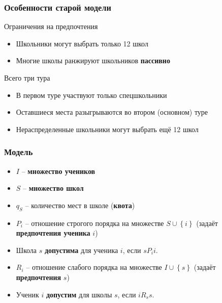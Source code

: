 \documentclass[10pt,pdf,hyperref={unicode}]{beamer}
\begin{document}
\begin{frame}
    \frametitle{Особенности старой модели}
    \begin{block}{Ограничения на предпочтения}
        \begin{itemize}
            \item Школьники могут выбрать только 12 школ
            \item Многие школы ранжируют школьников {\bf пассивно}
        \end{itemize}
    \end{block}

    \begin{block}{Всего три тура}
        \begin{itemize}
        \item В первом туре участвуют только спецшкольники
        \item Оставшиеся места разыгрываются во втором (основном) туре
        \item Нераспределенные школьники могут выбрать ещё 12 школ
        \end{itemize}
    \end{block}
\end{frame}

\begin{frame}
    \frametitle{Модель}
    \begin{itemize}
        \item $I$ -- {\bf множество учеников}
        \item $S$ -- {\bf множество школ}
        \item $q_S$ -- количество мест в школе ({\bf квота})
        \item $P_i$ -- отношение строгого порядка на множестве $S \cup \left\{i\right\}$ (задаёт {\bf предпочтения ученика} $i$)
        \item Школа $s$ {\bf допустима} для ученика $i$, если $s P_i i$.
        \item $R_i$ -- отношение слабого порядка на множестве $I \cup \left\{s\right\}$ (задаёт {\bf предпочтения} $s$)
        \item Ученик $i$ {\bf допустим} для школы $s$, если $i R_s s$.
    \end{itemize}
\end{frame}
\end{document}
